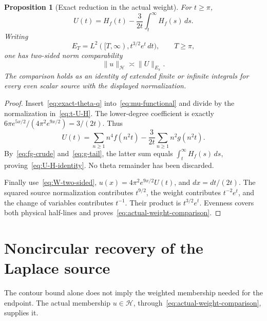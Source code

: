 \documentclass[11pt,a4paper]{article}
\numberwithin{equation}{section}
\newtheorem{proposition}[theorem]{Proposition}
\theoremstyle{definition}
\theoremstyle{remark}
\newcommand{\Hh}{\mathcal H}
\newcommand{\norm}[1]{\lVert #1\rVert}
\begin{document}
\begin{proposition}[Exact reduction in the actual weight]\label{prop:exact-reduction}
For $t\ge\pi$,
\begin{equation}\label{eq:U-H-identity}
 U(t)=H_f(t)-\frac3{2t}\int_t^\infty H_f(s)\,ds.
\end{equation}
Writing
\begin{equation}\label{eq:E-tail}
 E_T=L^2([T,\infty),t^{3/2}e^t\,dt),\qquad T\ge\pi,
\end{equation}
one has two-sided norm comparability
\begin{equation}\label{eq:actual-weight-comparison}
 \norm{u}_{\Hh}\asymp\norm{U}_{E_\pi}.
\end{equation}
The comparison holds as an identity of extended finite or infinite integrals for every even scalar source with the displayed normalization.
\end{proposition}
\begin{proof}
Insert~\eqref{eq:exact-theta-q} into~\eqref{eq:mu-functional} and divide by the normalization in~\eqref{eq:t-U-H}. The lower-degree coefficient is exactly
$6\pi e^{5x/2}/(4\pi^2e^{9x/2})=3/(2t)$. Thus
\[
 U(t)=\sum_{n\ge1}n^4f(n^2t)
       -\frac3{2t}\sum_{n\ge1}n^2g(n^2t).
\]
By~\eqref{eq:fg-crude} and~\eqref{eq:g-tail}, the latter sum equals
$\int_t^\infty H_f(s)\,ds$, proving~\eqref{eq:U-H-identity}. No theta remainder has been discarded.

Finally use~\eqref{eq:W-two-sided}, $u(x)=4\pi^2e^{9x/2}U(t)$, and $dx=dt/(2t)$. The squared source normalization contributes $t^{9/2}$, the weight contributes $t^{-2}e^t$, and the change of variables contributes $t^{-1}$. Their product is $t^{3/2}e^t$. Evenness covers both physical half-lines and proves~\eqref{eq:actual-weight-comparison}.
\end{proof}

\section{Noncircular recovery of the Laplace source}\label{sec:source-recovery}

The contour bound alone does not imply the weighted membership needed for the endpoint. The actual membership $u\in\Hh$, through~\eqref{eq:actual-weight-comparison}, supplies it.
\end{document}
